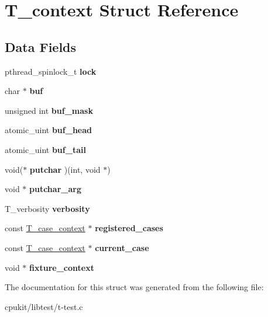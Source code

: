 \hypertarget{structT__context}{}\section{T\+\_\+context Struct Reference}
\label{structT__context}
\subsection*{Data Fields}
\begin{DoxyCompactItemize}
\item 
\mbox{\label{structT__context_a6e793c34be954ed9d42889f54d601551}} 
pthread\+\_\+spinlock\+\_\+t {\bfseries lock}
\item 
\mbox{\label{structT__context_a03519941335d1868f30cf44b81680d06}} 
char $\ast$ {\bfseries buf}
\item 
\mbox{\label{structT__context_a851f15b57952c477a370f1a7d3bf3462}} 
unsigned int {\bfseries buf\+\_\+mask}
\item 
\mbox{\label{structT__context_a856d2c78bc4c9f253e072ec08dd85774}} 
atomic\+\_\+uint {\bfseries buf\+\_\+head}
\item 
\mbox{\label{structT__context_a68534b2c79abd8389fb3582c067eeb48}} 
atomic\+\_\+uint {\bfseries buf\+\_\+tail}
\item 
\mbox{\label{structT__context_acf4208aadeb4e170a24a90150d29a1f9}} 
void($\ast$ {\bfseries putchar} )(int, void $\ast$)
\item 
\mbox{\label{structT__context_ab52d15c111789b5355c4eca6049cce22}} 
void $\ast$ {\bfseries putchar\+\_\+arg}
\item 
\mbox{\label{structT__context_abeedb4f2d0e46315ecc7be2b52d87b6b}} 
T\+\_\+verbosity {\bfseries verbosity}
\item 
\mbox{\label{structT__context_a4b7cf1964b7e77b88df469e389ce2641}} 
const \mbox{\hyperlink{structT__case__context}{T\+\_\+case\+\_\+context}} $\ast$ {\bfseries registered\+\_\+cases}
\item 
\mbox{\label{structT__context_a876d773c0b5bce584383fe0e77e1f4a6}} 
const \mbox{\hyperlink{structT__case__context}{T\+\_\+case\+\_\+context}} $\ast$ {\bfseries current\+\_\+case}
\item 
\mbox{\label{structT__context_a9ce8d6754c58803c374aeb3f1746832b}} 
void $\ast$ {\bfseries fixture\+\_\+context}
\end{DoxyCompactItemize}


The documentation for this struct was generated from the following file\+:\begin{DoxyCompactItemize}
\item 
cpukit/libtest/t-\/test.\+c\end{DoxyCompactItemize}
